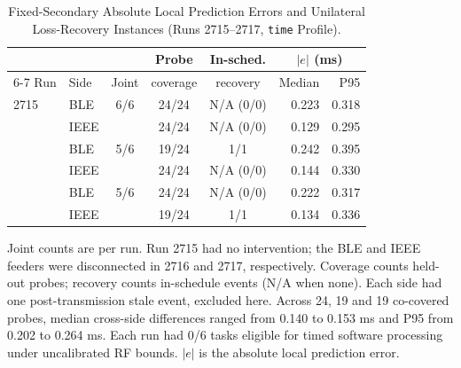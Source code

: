 \begin{table}[t]
\centering
\caption{Fixed-Secondary Absolute Local Prediction Errors and Unilateral Loss-Recovery Instances (Runs 2715--2717, \texttt{time} Profile).}
\label{tab:p2_time}
\footnotesize
\setlength{\tabcolsep}{1pt}
\begin{tabular*}{\columnwidth}{@{}l@{\extracolsep{\fill}}lcccrr@{}}
\toprule
 & & & Probe & In-sched. & \multicolumn{2}{c}{$|e|$ (ms)} \\
\cmidrule(l){6-7}
Run & Side & Joint & coverage & recovery & Median & P95 \\
\midrule
2715 & BLE  & 6/6 & 24/24 & N/A (0/0) & 0.223 & 0.318 \\
     & IEEE &     & 24/24 & N/A (0/0) & 0.129 & 0.295 \\
\addlinespace
2716 & BLE  & 5/6 & 19/24 & 1/1       & 0.242 & 0.395 \\
     & IEEE &     & 24/24 & N/A (0/0) & 0.144 & 0.330 \\
\addlinespace
2717 & BLE  & 5/6 & 24/24 & N/A (0/0) & 0.222 & 0.317 \\
     & IEEE &     & 19/24 & 1/1       & 0.134 & 0.336 \\
\bottomrule
\end{tabular*}
\par\smallskip
\raggedright\scriptsize
Joint counts are per run. Run 2715 had no intervention; the BLE and IEEE feeders were disconnected in 2716 and 2717, respectively. Coverage counts held-out probes; recovery counts in-schedule events (N/A when none). Each side had one post-transmission stale event, excluded here. Across 24, 19 and 19 co-covered probes, median cross-side differences ranged from 0.140 to 0.153 ms and P95 from 0.202 to 0.264 ms. Each run had 0/6 tasks eligible for timed software processing under uncalibrated RF bounds. $|e|$ is the absolute local prediction error.
\end{table}
